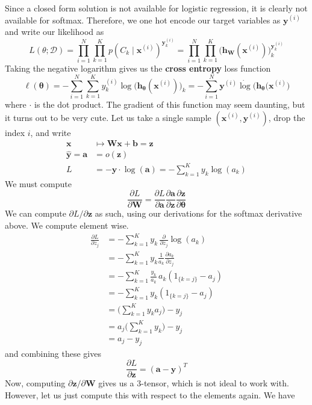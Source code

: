 \documentclass{article}
\theoremstyle{definition}
\theoremstyle{remark}
\theoremstyle{definition}
\begin{document}
Since a closed form solution is not available for logistic regression, it is clearly not available for softmax. Therefore, we one hot encode our target variables as $\mathbf{y}^{(i)}$ and write our likelihood as 
\[L(\theta; \mathcal{D}) = \prod_{i=1}^N \prod_{k=1}^K p(C_k \mid \mathbf{x}^{(i)})^{\mathbf{y}^{(i)}_k} = \prod_{i=1}^N \prod_{k=1}^K \big( \mathbf{h}_\mathbf{W} (\mathbf{x}^{(i)})\big)_k^{\mathbf{y}_k^{(i)}} \]
Taking the negative logarithm gives us the \textbf{cross entropy} loss function
\[\ell (\boldsymbol{\theta}) = - \sum_{i=1}^N \sum_{k=1}^K y^{(i)}_k \log \big( \mathbf{h}_{\boldsymbol{\theta}} (\mathbf{x}^{(i)})\big)_k = - \sum_{i=1}^N \mathbf{y}^{(i)} \dot \log \big( \mathbf{h}_{\boldsymbol{\theta}} (\mathbf{x}^{(i)} \big) \]
where $\cdot$ is the dot product. The gradient of this function may seem daunting, but it turns out to be very cute. Let us take a single sample $(\mathbf{x}^{(i)}, \mathbf{y}^{(i)})$, drop the index $i$, and write
\begin{align*}
    \mathbf{x} & \mapsto \mathbf{W} \mathbf{x} + \mathbf{b} = \mathbf{z} \\
    \hat{\mathbf{y}} = \mathbf{a} & = o (\mathbf{z}) \\
    L & = - \mathbf{y} \cdot \log (\mathbf{a}) = - \sum_{k=1}^K y_k \log(a_k)
\end{align*}
We must compute 
\[\frac{\partial L}{\partial \mathbf{W}} = \frac{\partial L}{\partial \mathbf{a}} \frac{\partial \mathbf{a}}{\partial \mathbf{z}} \frac{\partial \mathbf{z}}{\partial \boldsymbol{\theta}}\]
We can compute $\partial L /\partial \mathbf{z}$ as such, using our derivations for the softmax derivative above. We compute element wise. 
\begin{align*}
    \frac{\partial L}{\partial z_j} & = - \sum_{k=1}^K y_k \, \frac{\partial}{\partial z_j} \log (a_k) \\
    & = - \sum_{k=1}^K y_k \frac{1}{a_k} \frac{\partial a_k}{\partial z_j} \\
    & = - \sum_{k=1}^K \frac{y_k}{a_k} \, a_k (1_{\{k = j\}} - a_j) \\
    & = - \sum_{k=1}^K y_k (1_{\{k = j\}} - a_j) \\
    & = \bigg( \sum_{k=1}^K y_k a_j \bigg) - y_j \\
    & = a_j \bigg( \sum_{k=1}^K y_k \bigg) - y_j \\
    & = a_j - y_j
\end{align*}
and combining these gives 
\[\frac{\partial L}{\partial \mathbf{z}} = (\mathbf{a} - \mathbf{y})^T\]
Now, computing $\partial \mathbf{z} / \partial \mathbf{W}$ gives us a $3$-tensor, which is not ideal to work with. However, let us just compute this with respect to the elements again. We have 
\end{document}

